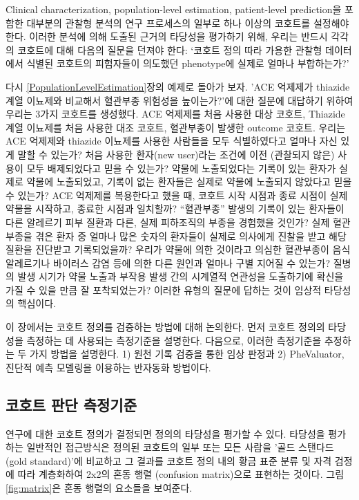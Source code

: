 \documentclass[11pt]{book}
\theoremstyle{definition}
\theoremstyle{definition}
\theoremstyle{definition}
\theoremstyle{remark}
\begin{document}
Clinical characterization, population-level estimation, patient-level
prediction을 포함한 대부분의 관찰형 분석의 연구 프로세스의 일부로 하나
이상의 코호트를 설정해야 한다. 이러한 분석에 의해 도출된 근거의 타당성을
평가하기 위해, 우리는 반드시 각각의 코호트에 대해 다음의 질문을 던져야
한다: `코호트 정의 따라 가용한 관찰형 데이터에서 식별된 코호트의
피험자들이 의도했던 phenotype에 실제로 얼마나 부합하는가?'

다시 \ref{PopulationLevelEstimation}장의 예제로 돌아가 보자. 'ACE
억제제가 thiazide 계열 이뇨제와 비교해서 혈관부종 위험성을 높이는가?'에
대한 질문에 대답하기 위하여 우리는 3가지 코호트를 생성했다. ACE 억제제를
처음 사용한 대상 코호트, Thiazide 계열 이뇨제를 처음 사용한 대조 코호트,
혈관부종이 발생한 outcome 코호트. 우리는 ACE 억제제와 thiazide 이뇨제를
사용한 사람들을 모두 식별하였다고 얼마나 자신 있게 말할 수 있는가? 처음
사용한 환자(new user)라는 조건에 이전 (관찰되지 않은) 사용이 모두
배제되었다고 믿을 수 있는가? 약물에 노출되었다는 기록이 있는 환자가
실제로 약물에 노출되었고, 기록이 없는 환자들은 실제로 약물에 노출되지
않았다고 믿을 수 있는가? ACE 억제제를 복용한다고 했을 때, 코호트 시작
시점과 종료 시점이 실제 약물을 시작하고, 종료한 시점과 일치할까?
``혈관부종'' 발생의 기록이 있는 환자들이 다른 알레르기 피부 질환과 다른,
실제 피하조직의 부종을 경험했을 것인가? 실제 혈관 부종을 겪은 환자 중
얼마나 많은 숫자의 환자들이 실제로 의사에게 진찰을 받고 해당 질환을
진단받고 기록되었을까? 우리가 약물에 의한 것이라고 의심한 혈관부종이
음식 알레르기나 바이러스 감염 등에 의한 다른 원인과 얼마나 구별 지어질
수 있는가? 질병의 발생 시기가 약물 노출과 부작용 발생 간의 시계열적
연관성을 도출하기에 확신을 가질 수 있을 만큼 잘 포착되었는가? 이러한
유형의 질문에 답하는 것이 임상적 타당성의 핵심이다.

이 장에서는 코호트 정의를 검증하는 방법에 대해 논의한다. 먼저 코호트
정의의 타당성을 측정하는 데 사용되는 측정기준을 설명한다. 다음으로,
이러한 측정기준을 추정하는 두 가지 방법을 설명한다. 1) 원천 기록 검증을
통한 임상 판정과 2) PheValuator, 진단적 예측 모델링을 이용하는 반자동화
방법이다.

\subsection{코호트 판단 측정기준}\label{--}

연구에 대한 코호트 정의가 결정되면 정의의 타당성을 평가할 수 있다.
타당성을 평가하는 일반적인 접근방식은 정의된 코호트의 일부 또는 모든
사람을 '골드 스탠다드(gold standard)'에 비교하고 그 결과를 코호트 정의
내의 황금 표준 분류 및 자격 검정에 따라 계층화하여 2x2의 혼동 행렬
(confusion matrix)으로 표현하는 것이다. 그림 \ref{fig:matrix}은 혼동
행렬의 요소들을 보여준다.
\end{document}
